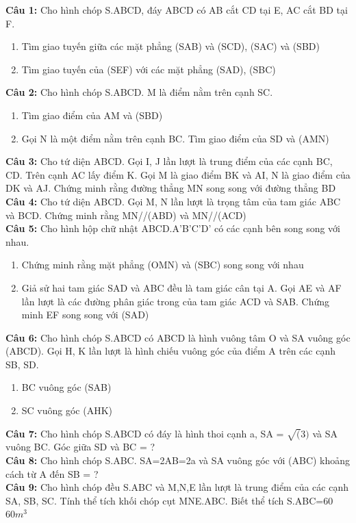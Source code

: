 \documentclass[12pt,a4paper]{extarticle}
\begin{document}
\makeheadbox[headerright={Tổng ôn 10-11},chude={CHỦ ĐỀ 10},tieude={Hình học không gian},dinhdang={Hình học},lop={12 },gv={Nguyễn Lê Minh Ngọc}]

\vspace{2em}
\textbf{Câu 1:} Cho hình chóp S.ABCD, đáy ABCD có AB cắt CD tại E, AC cắt BD tại F.
\begin{enumerate}
\item Tìm giao tuyến giữa các mặt phẳng (SAB) và (SCD), (SAC) và (SBD)
\item Tìm giao tuyến của (SEF) với các mặt phẳng (SAD), (SBC)
\end{enumerate}
\textbf{Câu 2:} Cho hình chóp S.ABCD. M là điểm nằm trên cạnh SC.
\begin{enumerate}
\item Tìm giao điểm của AM và (SBD)
\item Gọi N là một điểm nằm trên cạnh BC. Tìm giao điểm của SD và (AMN)
\end{enumerate}
\textbf{Câu 3: }Cho tứ diện ABCD. Gọi I, J lần lượt là trung điểm của các cạnh BC, CD. Trên cạnh AC lấy điểm K. Gọi M là giao điểm BK và AI, N là giao điểm của DK và AJ. Chứng minh rằng đường thẳng MN song song với đường thẳng BD\\
\vspace{0.5cm}
\textbf{Câu 4: }Cho tứ diện ABCD. Gọi M, N lần lượt là trọng tâm của tam giác ABC và BCD. Chứng minh rằng MN//(ABD) và MN//(ACD) \\ 
\vspace{0.5cm}
\textbf{Câu 5: }Cho hình hộp chữ nhật ABCD.A'B'C'D' có các cạnh bên song song với nhau.
\begin{enumerate}
\item Chứng minh rằng mặt phẳng (OMN) và (SBC) song song với nhau
\item Giả sử hai tam giác SAD và ABC đều là tam giác cân tại A. Gọi AE và AF lần lượt là các đường phân giác trong của tam giác ACD và SAB. Chứng minh EF song song với (SAD)
\end{enumerate}
\textbf{Câu 6: }Cho hình chóp S.ABCD có ABCD là hình vuông tâm O và SA vuông góc (ABCD). Gọi H, K lần lượt là hình chiếu vuông góc của điểm A trên các cạnh SB, SD.
\begin{enumerate}
\item BC vuông góc (SAB)
\item SC vuông góc (AHK)
\end{enumerate}
\textbf{Câu 7: } Cho hình chóp S.ABCD có đáy là hình thoi cạnh a, SA = $\sqrt(3)$ và SA vuông BC. Góc giữa SD và BC = ? \\ 
\vspace{0.5cm}
\textbf{Câu 8: }Cho hình chóp S.ABC. SA=2AB=2a và SA vuông góc với (ABC) khoảng cách từ A đến SB = ? \\ 
\vspace{0.5cm}
\textbf{Câu 9: }Cho hình chóp đều S.ABC và M,N,E lần lượt là trung điểm của các cạnh SA, SB, SC. Tính thể tích khối chóp cụt MNE.ABC. Biết thể tích S.ABC=60 $60m^3$\\
\end{document}
